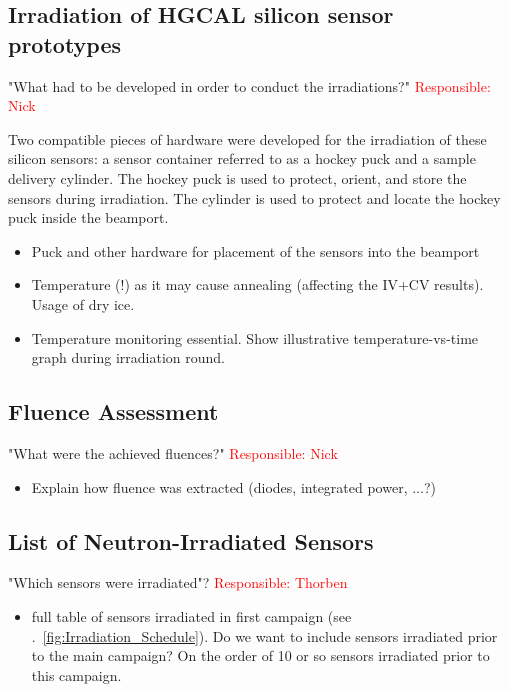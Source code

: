 \subsection{Irradiation of HGCAL silicon sensor prototypes}
\label{subsec:irradiation}
"What had to be developed in order to conduct the irradiations?" \textcolor{red}{Responsible: Nick}

Two compatible pieces of hardware were developed for the irradiation of these silicon sensors: a sensor container referred to as a hockey puck and a sample delivery cylinder. 
The hockey puck is used to protect, orient, and store the sensors during irradiation. 
The cylinder is used to protect and locate the hockey puck inside the beamport.

\begin{itemize}
  \item Puck and other hardware for placement of the sensors into the beamport
  \item Temperature (!) as it may cause annealing (affecting the IV+CV results). Usage of dry ice.
  \item Temperature monitoring essential. Show illustrative temperature-vs-time graph during irradiation round. 
\end{itemize}

\subsection{Fluence Assessment}
"What were the achieved fluences?" \textcolor{red}{Responsible: Nick}
\label{subsec:fluence_assessment}
\begin{itemize}
  \item Explain how fluence was extracted (diodes, integrated power, ...?)
\end{itemize}

\subsection{List of Neutron-Irradiated Sensors}
\label{subsec:sensors_irradiation}
"Which sensors were irradiated"? \textcolor{red}{Responsible: Thorben}
\begin{itemize}
  \item full table of sensors irradiated in first campaign (see .~\ref{fig:Irradiation_Schedule}). Do we want to include sensors irradiated prior to the main campaign? On the order of 10 or so sensors irradiated prior to this campaign.
\end{itemize}

